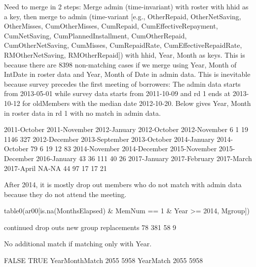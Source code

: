 Need to merge in 2 steps: Merge admin (time-invariant) with roster with \textsf{hhid} as a key, then merge to admin (time-variant {\footnotesize [e.g., OtherRepaid, OtherNetSaving, OtherMisses, CumOtherMisses, CumRepaid, CumEffectiveRepayment, CumNetSaving, CumPlannedInstallment, CumOtherRepaid, CumOtherNetSaving, CumMisses, CumRepaidRate, CumEffectiveRepaidRate, RMOtherNetSaving, RMOtherRepaid]}) with \textsf{hhid, Year, Month} as keys. This is because there are 8398 non-matching cases if we merge using \textsf{Year, Month} of \textsf{IntDate} in roster data and \textsf{Year, Month} of \textsf{Date} in admin data. This is inevitable because survey precedes the first meeting of borrowers: The admin data starts from 2013-05-01 while survey data starts from 2011-10-09 and rd 1 ends at 2013-10-12 for \textsf{oldMember}s with the median date 2012-10-20. Below gives \textsf{Year, Month} in roster data in rd 1 with no match in admin data.
\begin{Schunk}
\begin{Soutput}

  2011-October  2011-November   2012-January   2012-October  2012-November 
             6              1             19           1146            327 
 2012-December 2013-September   2013-October   2014-January   2014-October 
            79              6             19             12             83 
 2014-November  2014-December  2015-November  2015-December   2016-January 
            43             36            111             40             26 
  2017-January  2017-February     2017-March     2017-April          NA-NA 
            44             97             17             17             21 
\end{Soutput}
\end{Schunk}
After 2014, it is mostly drop out members who do not match with admin data because they do not attend the meeting.
\begin{Schunk}
\begin{Sinput}
table0(ar00[is.na(MonthsElapsed) & MemNum == 1 & Year >= 2014, 
  Mgroup])
\end{Sinput}
\begin{Soutput}

   continued    drop outs    new group replacements 
          78          381           58            9 
\end{Soutput}
\end{Schunk}
No additional match if matching only with \textsf{Year}. 
\begin{Schunk}
\begin{Soutput}
               FALSE TRUE
YearMonthMatch  2055 5958
YearMatch       2055 5958
\end{Soutput}
\end{Schunk}
